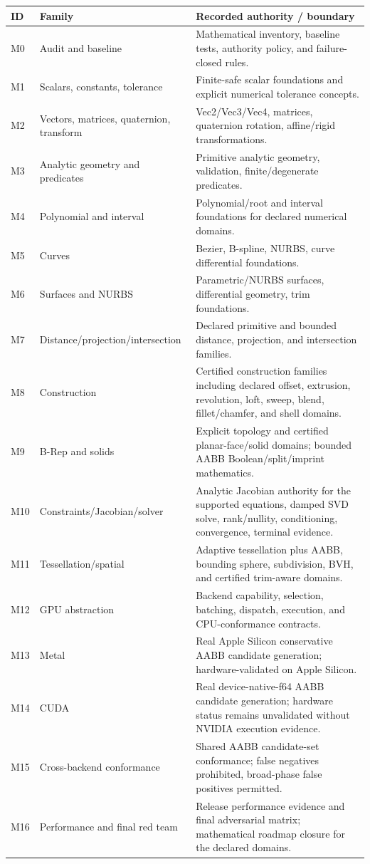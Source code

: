 \documentclass[11pt,a4paper]{report}
\begin{document}
\begin{longtable}{@{}p{}p{}p{}@{}}
\toprule
ID & Family & Recorded authority / boundary \\
\midrule
M0 & Audit and baseline & Mathematical inventory, baseline tests, authority policy, and failure-closed rules. \\
M1 & Scalars, constants, tolerance & Finite-safe scalar foundations and explicit numerical tolerance concepts. \\
M2 & Vectors, matrices, quaternion, transform & Vec2/Vec3/Vec4, matrices, quaternion rotation, affine/rigid transformations. \\
M3 & Analytic geometry and predicates & Primitive analytic geometry, validation, finite/degenerate predicates. \\
M4 & Polynomial and interval & Polynomial/root and interval foundations for declared numerical domains. \\
M5 & Curves & Bezier, B-spline, NURBS, curve differential foundations. \\
M6 & Surfaces and NURBS & Parametric/NURBS surfaces, differential geometry, trim foundations. \\
M7 & Distance/projection/intersection & Declared primitive and bounded distance, projection, and intersection families. \\
M8 & Construction & Certified construction families including declared offset, extrusion, revolution, loft, sweep, blend, fillet/chamfer, and shell domains. \\
M9 & B-Rep and solids & Explicit topology and certified planar-face/solid domains; bounded AABB Boolean/split/imprint mathematics. \\
M10 & Constraints/Jacobian/solver & Analytic Jacobian authority for the supported equations, damped SVD solve, rank/nullity, conditioning, convergence, terminal evidence. \\
M11 & Tessellation/spatial & Adaptive tessellation plus AABB, bounding sphere, subdivision, BVH, and certified trim-aware domains. \\
M12 & GPU abstraction & Backend capability, selection, batching, dispatch, execution, and CPU-conformance contracts. \\
M13 & Metal & Real Apple Silicon conservative AABB candidate generation; hardware-validated on Apple Silicon. \\
M14 & CUDA & Real device-native-f64 AABB candidate generation; hardware status remains unvalidated without NVIDIA execution evidence. \\
M15 & Cross-backend conformance & Shared AABB candidate-set conformance; false negatives prohibited, broad-phase false positives permitted. \\
M16 & Performance and final red team & Release performance evidence and final adversarial matrix; mathematical roadmap closure for the declared domains. \\
\bottomrule
\end{longtable}
\end{document}
